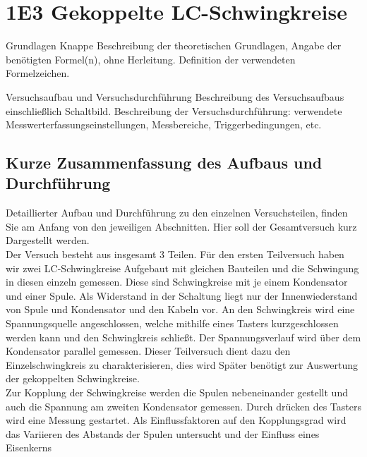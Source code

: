 \documentclass[twoside]{protokoll}
\begin{document}
 
\section{1E3 Gekoppelte LC-Schwingkreise}

\begin{aufgabe}{Grundlagen}
  Knappe Beschreibung der theoretischen Grundlagen, Angabe der
  benötigten Formel(n), ohne Herleitung. Definition der verwendeten
  Formelzeichen.
\end{aufgabe}

\begin{aufgabe}{Versuchsaufbau und Versuchsdurchführung}
  Beschreibung des Versuchsaufbaus einschließlich
  Schaltbild. Beschreibung der Versuchsdurchführung: verwendete
  Messwerterfassungseinstellungen, Messbereiche, Triggerbedingungen,
  etc.
\end{aufgabe}

\subsection{Kurze Zusammenfassung des Aufbaus und Durchführung}

Detaillierter Aufbau und Durchführung zu den einzelnen Versuchsteilen, finden Sie am Anfang von den jeweiligen Abschnitten. 
Hier soll der Gesamtversuch kurz Dargestellt werden.\\

Der Versuch besteht aus insgesamt 3 Teilen. Für den ersten Teilversuch haben wir zwei LC-Schwingkreise Aufgebaut mit gleichen Bauteilen und die Schwingung in diesen einzeln gemessen. 
Diese sind Schwingkreise mit je einem Kondensator und einer Spule.
Als Widerstand in der Schaltung liegt nur der Innenwiederstand von Spule und Kondensator und den Kabeln vor. 
An den Schwingkreis wird eine Spannungsquelle angeschlossen, welche mithilfe eines Tasters kurzgeschlossen werden kann und den Schwingkreis schließt. 
Der Spannungsverlauf wird über dem Kondensator parallel gemessen. 
Dieser Teilversuch dient dazu den Einzelschwingkreis zu charakterisieren, dies wird Später benötigt zur Auswertung der gekoppelten Schwingkreise.\\

Zur Kopplung der Schwingkreise werden die Spulen nebeneinander gestellt und auch die Spannung am zweiten Kondensator gemessen. Durch drücken des Tasters wird eine Messung gestartet.
Als Einflussfaktoren auf den Kopplungsgrad wird das Variieren des Abstands der Spulen untersucht und der Einfluss eines Eisenkerns\\
\end{document}
